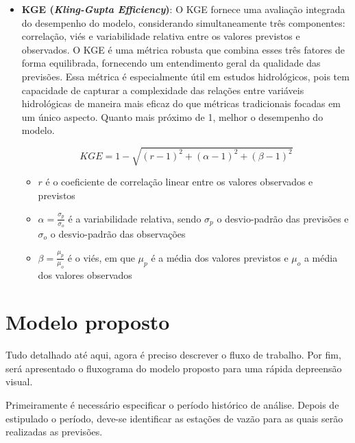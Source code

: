 \begin{itemize}
	\item \textbf{KGE (\textit{Kling-Gupta Efficiency})}: O KGE fornece uma avaliação integrada do desempenho do modelo, considerando simultaneamente três componentes: correlação, viés e variabilidade relativa entre os valores previstos e observados. O KGE é uma métrica robusta que combina esses três fatores de forma equilibrada, fornecendo um entendimento geral da qualidade das previsões. Essa métrica é especialmente útil em estudos hidrológicos, pois tem capacidade de capturar a complexidade das relações entre variáveis hidrológicas de maneira mais eficaz do que métricas tradicionais focadas em um único aspecto. Quanto mais próximo de 1, melhor o desempenho do modelo.\cite{Gupta2009}
	
	\begin{equation}
		KGE = 1 - \sqrt{(r - 1)^2 + (\alpha - 1)^2 + (\beta - 1)^2}
	\end{equation}
	\begin{itemize}
		\item $r$ é o coeficiente de correlação linear entre os valores observados e previstos 
		\item $\alpha = \frac{\sigma_p}{\sigma_o}$ é a variabilidade relativa, sendo $\sigma_p$ o desvio-padrão das previsões e $\sigma_o$ o desvio-padrão das observações
		\item $\beta = \frac{\mu_p}{\mu_o}$ é o viés, em que $\mu_p$ é a média dos valores previstos e $\mu_o$ a média dos valores observados		
	\end{itemize}
	
\end{itemize}


\section{Modelo proposto}

Tudo detalhado até aqui, agora é preciso descrever o fluxo de trabalho. Por fim, será apresentado o fluxograma do modelo proposto para uma rápida depreensão visual.

Primeiramente é necessário especificar o período histórico de análise. Depois de estipulado o período, deve-se identificar as estações de vazão para as quais serão realizadas as previsões.


